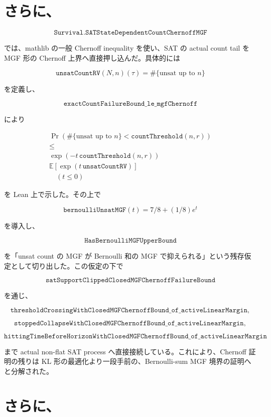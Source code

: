 \documentclass[12pt,a4paper]{article}
\begin{document}
\section{さらに、}\label{ux3055ux3089ux306b-28}

\[
\texttt{Survival.SATStateDependentCountChernoffMGF}
\]

では、mathlib の一般 Chernoff inequality を使い、SAT の actual count tail を MGF 形の Chernoff 上界へ直接押し込んだ。具体的には

\[
\texttt{unsatCountRV}(N,n)(\tau)=\#\{\text{unsat up to }n\}
\]

を定義し、

\[
\texttt{exactCountFailureBound\_le\_mgfChernoff}
\]

により

\[
\begin{aligned}
\Pr(\#\{\text{unsat up to }n\}<\texttt{countThreshold}(n,r)) \\
\le \\
\exp(-t\,\texttt{countThreshold}(n,r))\, \\
\mathbb E[\exp(t\,\texttt{unsatCountRV})] \\
\quad (t\le 0)
\end{aligned}
\]

を Lean 上で示した。その上で

\[
\texttt{bernoulliUnsatMGF}(t)=7/8+(1/8)e^t
\]

を導入し、

\[
\texttt{HasBernoulliMGFUpperBound}
\]

を「unsat count の MGF が Bernoulli 和の MGF で抑えられる」という残存仮定として切り出した。この仮定の下で

\[
\texttt{satSupportClippedClosedMGFChernoffFailureBound}
\]

を通じ、

\[
\texttt{thresholdCrossingWithClosedMGFChernoffBound\_of\_activeLinearMargin},
\]

\[
\texttt{stoppedCollapseWithClosedMGFChernoffBound\_of\_activeLinearMargin},
\]

\[
\texttt{hittingTimeBeforeHorizonWithClosedMGFChernoffBound\_of\_activeLinearMargin}
\]

まで actual non-flat SAT process へ直接接続している。これにより、Chernoff 証明の残りは KL 形の最適化より一段手前の、Bernoulli-sum MGF 境界の証明へと分解された。

\section{さらに、}\label{ux3055ux3089ux306b-29}
\end{document}
